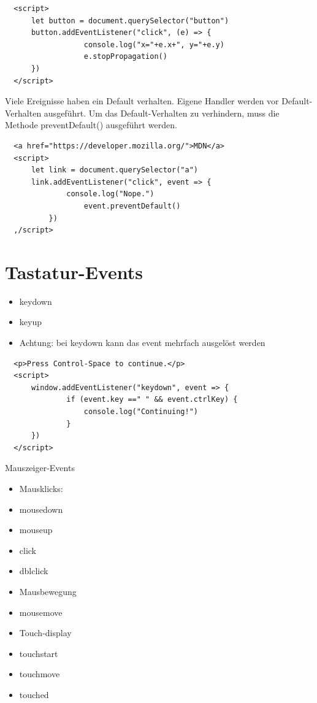   \begin{verbatim}
  <script>
      let button = document.querySelector("button")
      button.addEventListener("click", (e) => {
                  console.log("x="+e.x+", y="+e.y)
                  e.stopPropagation()
      })
  </script>
  \end{verbatim}
  
  Viele Ereignisse haben ein Default verhalten. Eigene Handler werden vor Default-Verhalten ausgeführt. Um das Default-Verhalten zu verhindern, muss die Methode preventDefault() ausgeführt werden.
  
  \begin{verbatim}
  <a href="https://developer.mozilla.org/">MDN</a>
  <script>
      let link = document.querySelector("a")
      link.addEventListener("click", event => {
              console.log("Nope.")
                  event.preventDefault()
          })
  ,/script>
  \end{verbatim}
  
  \section*{Tastatur-Events}
  \begin{itemize}
    \item keydown
    \item keyup
    \item Achtung: bei keydown kann das event mehrfach ausgelöst werden
  \end{itemize}
  
  \begin{verbatim}
  <p>Press Control-Space to continue.</p>
  <script>
      window.addEventListener("keydown", event => {
              if (event.key ==" " && event.ctrlKey) {
                  console.log("Continuing!")
              }
      })
  </script>
  \end{verbatim}
  
  Mauszeiger-Events
  
  \begin{itemize}
    \item Mausklicks:
    \item mousedown
    \item mouseup
    \item click
    \item dblclick
    \item Mausbewegung
    \item mousemove
    \item Touch-display
    \item touchstart
    \item touchmove
    \item touched
  \end{itemize}
  
